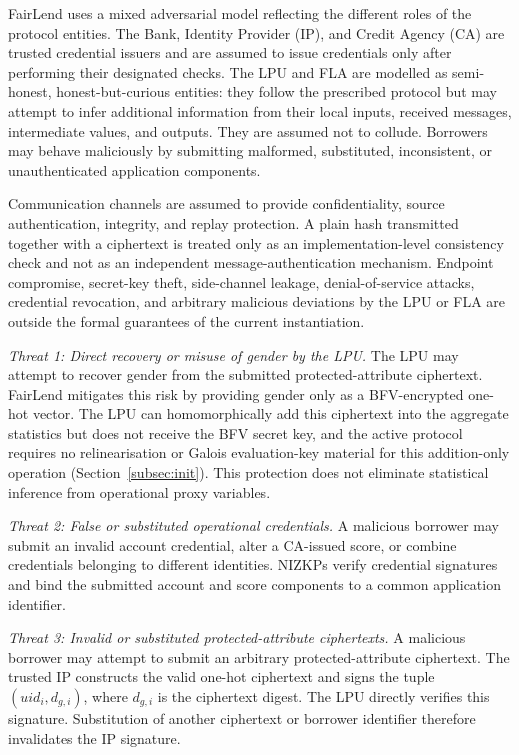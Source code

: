 \documentclass[a4paper,fleqn]{cas-dc}
\begin{document}
FairLend uses a mixed adversarial model reflecting the different roles of the protocol entities. The Bank, Identity Provider (IP), and Credit Agency (CA) are trusted credential issuers and are assumed to issue credentials only after performing their designated checks. The LPU and FLA are modelled as semi-honest, honest-but-curious entities: they follow the prescribed protocol but may attempt to infer additional information from their local inputs, received messages, intermediate values, and outputs. They are assumed not to collude. Borrowers may behave maliciously by submitting malformed, substituted, inconsistent, or unauthenticated application components. 

Communication channels are assumed to provide confidentiality, source authentication, integrity, and replay protection. A plain hash transmitted together with a ciphertext is treated only as an implementation-level consistency check and not as an independent message-authentication mechanism. Endpoint compromise, secret-key theft, side-channel leakage, denial-of-service attacks, credential revocation, and arbitrary malicious deviations by the LPU or FLA are outside the formal guarantees of the current instantiation. 

\textit{Threat 1: Direct recovery or misuse of gender by the LPU.} The LPU may attempt to recover gender from the submitted protected-attribute ciphertext. FairLend mitigates this risk by providing gender only as a BFV-encrypted one-hot vector. The LPU can homomorphically add this ciphertext into the aggregate statistics but does not receive the BFV secret key, and the active protocol requires no relinearisation or Galois evaluation-key material for this addition-only operation (Section~\ref{subsec:init}). This protection does not eliminate statistical inference from operational proxy variables.

\textit{Threat 2: False or substituted operational credentials.} A malicious borrower may submit an invalid account credential, alter a CA-issued score, or combine credentials belonging to different identities. NIZKPs verify credential signatures and bind the submitted account and score components to a common application identifier. 

\textit{Threat 3: Invalid or substituted protected-attribute ciphertexts.}
A malicious borrower may attempt to submit an arbitrary protected-attribute
ciphertext. The trusted IP constructs the valid one-hot ciphertext and signs
the tuple $(uid_i,d_{g,i})$, where $d_{g,i}$ is the ciphertext digest. The LPU
directly verifies this signature. Substitution of another ciphertext or
borrower identifier therefore invalidates the IP signature.
\end{document}

